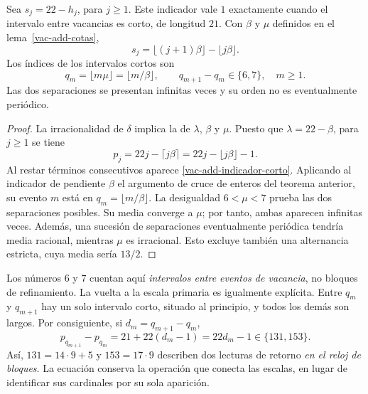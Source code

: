 \begin{theorem}
\label{vac-add-teorema-secundario}
Sea \(s_j=22-h_j\), para \(j\geq1\). Este indicador vale \(1\)
exactamente cuando el intervalo entre vacancias es corto, de longitud
\(21\). Con \(\beta\) y \(\mu\) definidos en el
lema~\ref{vac-add-cotas},
\begin{equation}
 s_j=\lfloor(j+1)\beta\rfloor-\lfloor j\beta\rfloor.
 \label{vac-add-indicador-corto}
\end{equation}
Los índices de los intervalos cortos son
\begin{equation}
 q_m=\lfloor m\mu\rfloor=\lfloor m/\beta\rfloor,
 \qquad q_{m+1}-q_m\in\{6,7\},\quad m\geq1.
 \label{vac-add-posiciones-cortos}
\end{equation}
Las dos separaciones se presentan infinitas veces y su orden no es
eventualmente periódico.
\end{theorem}
\begin{proof}
La irracionalidad de \(\delta\) implica la de \(\lambda\),
\(\beta\) y \(\mu\). Puesto que \(\lambda=22-\beta\), para
\(j\geq1\) se tiene
\[
 p_j=22j-\lceil j\beta\rceil
     =22j-\lfloor j\beta\rfloor-1.
\]
Al restar términos consecutivos aparece
\eqref{vac-add-indicador-corto}. Aplicando al indicador de pendiente
\(\beta\) el argumento de cruce de enteros del teorema anterior,
su evento \(m\) está en \(q_m=\lfloor m/\beta\rfloor\).
La desigualdad \(6<\mu<7\) prueba las dos separaciones posibles.
Su media converge a \(\mu\); por tanto, ambas aparecen infinitas
veces. Además, una sucesión de separaciones eventualmente periódica
tendría media racional, mientras \(\mu\) es irracional. Esto excluye
también una alternancia estricta, cuya media sería \(13/2\).
\end{proof}

Los números \(6\) y \(7\) cuentan aquí \emph{intervalos entre eventos
de vacancia}, no bloques de refinamiento. La vuelta a la escala primaria
es igualmente explícita. Entre \(q_m\) y \(q_{m+1}\) hay un solo
intervalo corto, situado al principio, y todos los demás son largos.
Por consiguiente, si \(d_m=q_{m+1}-q_m\),
\begin{equation}
 p_{q_{m+1}}-p_{q_m}=21+22(d_m-1)=22d_m-1
 \in\{131,153\}.
 \label{vac-add-retorno-bloques}
\end{equation}
Así, \(131=14\cdot9+5\) y \(153=17\cdot9\) describen dos lecturas
de retorno \emph{en el reloj de bloques}. La ecuación conserva la
operación que conecta las escalas, en lugar de identificar sus
cardinales por su sola aparición.

